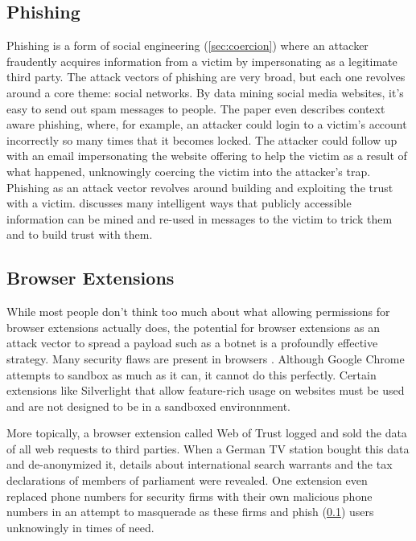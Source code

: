 \documentclass[a4paper, 11pt]{article}
\begin{document}
\subsection{Phishing}
\label{sec:phishing}
Phishing is a form of social engineering (\ref{sec:coercion}) where an attacker fraudently acquires information from a victim by impersonating as a legitimate third party. \cite{ref:phishing} The attack vectors of phishing are very broad, but each one revolves around a core theme: social networks. By data mining social media websites, it's easy to send out spam messages to people. \cite{ref:phishing} The paper even describes context aware phishing, where, for example, an attacker could login to a victim's account incorrectly so many times that it becomes locked. The attacker could follow up with an email impersonating the website offering to help the victim as a result of what happened, unknowingly coercing the victim into the attacker's trap. Phishing as an attack vector revolves around building and exploiting the trust with a victim. \cite{ref:phishing} discusses many intelligent ways that publicly accessible information can be mined and re-used in messages to the victim to trick them and to build trust with them. 

\subsection{Browser Extensions}
\label{sec:extensions}
While most people don't think too much about what allowing permissions for browser extensions actually does, the potential for browser extensions as an attack vector to spread a payload such as a botnet is a profoundly effective strategy. Many security flaws are present in browsers \cite{ref:reis2009browser, ref:soghoian2007remote}. Although Google Chrome attempts to sandbox as much as it can, it cannot do this perfectly. Certain extensions like Silverlight that allow feature-rich usage on websites must be used and are not designed to be in a sandboxed environnment. \cite{ref:reis2009browser}

More topically, a browser extension called Web of Trust logged and sold the data of all web requests to third parties. \cite{ref:brucker2017evil} When a German TV station bought this data and de-anonymized it, details about international search warrants and the tax declarations of members of parliament were revealed. \cite{ref:brucker2017evil} One extension even replaced phone numbers for security firms with their own malicious phone numbers in an attempt to masquerade as these firms and phish (\ref{sec:phishing}) users unknowingly in times of need.
\end{document}

